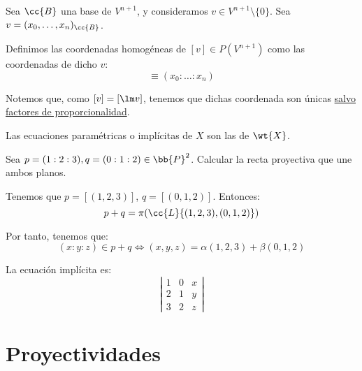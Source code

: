 Sea $\cc{B}$ una base de $V^{n+1}$, y consideramos $v \in V^{n+1}\setminus \{0\}$. Sea $v=(x_0,\dots,x_n)_{\cc{B}}$.

Definimos las coordenadas homogéneas de $[v]\in P(V^{n+1})$ como las coordenadas de dicho $v$:
\begin{equation*}
    [v] \equiv (x_0:\dots :x_n)
\end{equation*}

Notemos que, como $[v]=[\lm v]$, tenemos que dichas coordenada son únicas \ul{salvo factores de proporcionalidad}.

Las ecuaciones paramétricas o implícitas de $X$ son las de $\wt{X}$.

\begin{ejemplo}
    Sea $p=(1:2:3), q=(0:1:2)\in \bb{P}^2$. Calcular la recta proyectiva que une ambos planos.

    Tenemos que $p=[(1,2,3)]$, $q=[(0,1,2)]$. Entonces:
    \begin{equation*}
        p+q = \pi(\cc{L}\{(1,2,3), (0,1,2)\})
    \end{equation*}

    Por tanto, tenemos que:
    \begin{equation*}
        (x:y:z)\in p+q \Longleftrightarrow (x,y,z)=\alpha(1,2,3) + \beta(0,1,2)
    \end{equation*}

    La ecuación implícita es:
    \begin{equation*}
        \left|\begin{array}{ccc}
            1 & 0 & x \\
            2 & 1 & y\\
            3 & 2 & z
        \end{array}\right|
    \end{equation*}
\end{ejemplo}


\section{Proyectividades}

\begin{figure}[H]
    \centering
\end{figure}


